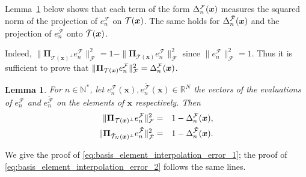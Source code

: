 \documentclass[twoside,11pt]{book}
\newtheorem{lemma}{Lemma}
\numberwithin{theorem}{chapter}
\numberwithin{definition}{chapter}
\numberwithin{proposition}{chapter}
\numberwithin{corollary}{chapter}
\numberwithin{example}{chapter}
\numberwithin{lemma}{chapter}
\numberwithin{assumption}{chapter}
\numberwithin{equation}{chapter}
\numberwithin{figure}{chapter}
\begin{document}
Lemma~\ref{lemma:interpolation_error_matricial_form} below shows that each term of the form $\Delta_n^{\cal F}(\bm{x})$ measures the squared norm of the projection of $e_{n}^{\mathcal{F}}$ on ${\cal T}(\bm{x})$. The same holds for $\Delta_n^{\tilde{\cal F}}(\bm{x})$ and the projection of $e_{n}^{\tilde{\mathcal{F}}}$ onto $\tilde{{\cal T}}(\bm{x})$.

Indeed, $\displaystyle \|\bm{\Pi}_{\mathcal{T}(\bm{x})^{\perp}}e_{n}^{\mathcal{F}}\|^{2}_{\mathcal{F}} = 1- \|\bm{\Pi}_{\mathcal{T}(\bm{x})}e_{n}^{\mathcal{F}}\|^{2}_{\mathcal{F}}$ since $\|e_{n}^{\mathcal{F}}\|^{2}_{\mathcal{F}} = 1$.
Thus it is sufficient to prove that $\|\bm{\Pi}_{\mathcal{T}(\bm{x})}e_{n}^{\mathcal{F}}\|^{2}_{\mathcal{F}} = \Delta_n^{\cal F}(\bm{x})$. 
\begin{lemma}\label{lemma:interpolation_error_matricial_form}
For $n \in \mathbb{N}^{*}$, let $e_{n}^{\mathcal{F}}(\bm{x}), e_{n}^{\tilde{\mathcal{F}}}(\bm{x})\in \mathbb{R}^{N}$ the vectors of the evaluations of $e_{n}^{\mathcal{F}}$ and $e_{n}^{\tilde{\mathcal{F}}}$ on the elements of $\bm{x}$ respectively. Then
\begin{eqnarray}
  \|\bm{\Pi}_{\mathcal{T}(\bm{x})^{\perp}}e_{n}^{\mathcal{F}}\|^{2}_{\mathcal{F}} & = & 1- \Delta_n^{\cal F}(\bm{x}), \label{eq:basis_element_interpolation_error_1}\\
  \|\bm{\Pi}_{\tilde{\mathcal{T}}_{N}(\bm{x})^{\perp}}e_{n}^{\tilde{\mathcal{F}}}\|^{2}_{\tilde{\mathcal{F}}} & = & 1- \Delta_n^{\tilde{\cal F}} (\bm{x}). \label{eq:basis_element_interpolation_error_2}
\end{eqnarray}
\end{lemma}\label{lemma:interpolation_error_kernel_formula}
We give the proof of \eqref{eq:basis_element_interpolation_error_1}; the proof of \eqref{eq:basis_element_interpolation_error_2} follows the same lines.
\end{document}
